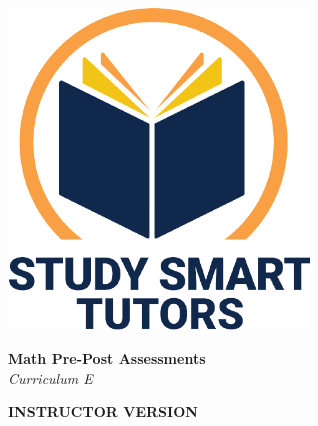 \documentclass[12pt]{article}
\begin{document}
\newpage


\newpage





\newpage
\thispagestyle{empty}
\vspace*{\fill}

\vspace*{10cm}






\thispagestyle{empty}

\vspace*{\fill}

\vspace*{3cm}

\begin{center}

    \includegraphics[width=0.6\textwidth]{SST_Color_Logo.png} %
    
    \vspace{2cm} %
    

    
    \Huge \textbf{ Math Pre-Post Assessments}\\
    \LARGE \textit{Curriculum E}\\[1cm]
 \vspace{2cm}

    \Huge \textbf{INSTRUCTOR VERSION}
    
   
    
    \vfill %
    
\end{center}

\newpage

%







\newpage





\newpage
\thispagestyle{empty}
\vspace*{\fill}

\vspace*{10cm}
\end{document}
